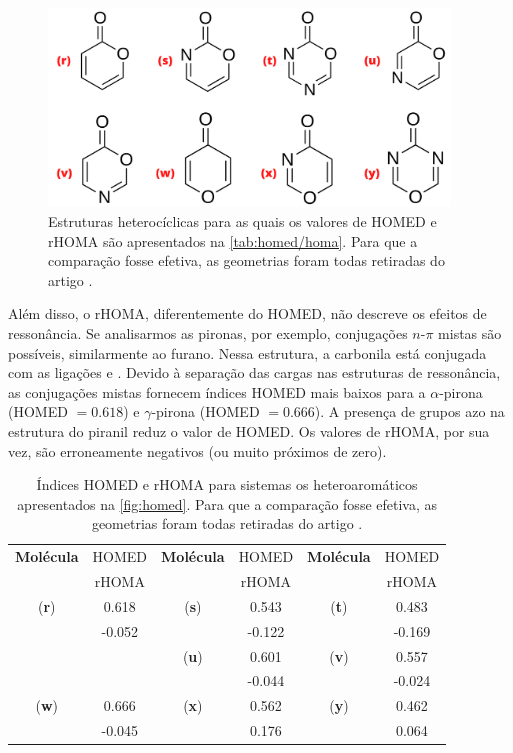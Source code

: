 \begin{figure}[htb]
\caption{\label{fig:homed/2} Estruturas heterocíclicas para as quais os valores de \gls{HOMED} e \gls{rHOMA} são apresentados na \autoref{tab:homed/homa}. Para que a comparação fosse efetiva, as geometrias foram todas retiradas do artigo \cite{giov2020}.}
	\begin{center}
		\includegraphics[width=0.95\textwidth]{images/fig2(8).png}
	\end{center}
\end{figure}

Além disso, o \gls{rHOMA}, diferentemente do \gls{HOMED}, não descreve os efeitos de ressonância. Se analisarmos as pironas, por exemplo, conjugações $n$-$\pi$ mistas são possíveis, similarmente ao furano. Nessa estrutura, a carbonila está conjugada com as ligações  e . Devido à separação das cargas nas estruturas de ressonância, as conjugações mistas fornecem índices \gls{HOMED} mais baixos para a $\alpha$-pirona (\gls{HOMED} $=0.618$) e $\gamma$-pirona (\gls{HOMED} $=0.666$). A presença de grupos azo na estrutura do piranil reduz o valor de \gls{HOMED}. Os valores de \gls{rHOMA}, por sua vez, são erroneamente negativos (ou muito próximos de zero).

\begin{table}[htb]
	\centering
	\caption{\label{tab:homed/homa} Índices \gls{HOMED} e \gls{rHOMA} para sistemas os heteroaromáticos apresentados na \autoref{fig:homed}. Para que a comparação fosse efetiva, as geometrias foram todas retiradas do artigo \cite{giov2020}.}
	\begin{tabular}{cccccc}
		\toprule
	\textbf{Molécula} & \gls{HOMED} & \textbf{Molécula} & \gls{HOMED} & \textbf{Molécula} & \gls{HOMED}
 \\
  & \gls{rHOMA} & & \gls{rHOMA} & & \gls{rHOMA}
 \\
		\midrule
    (\textbf{r}) & 0.618 & (\textbf{s}) & 0.543 & (\textbf{t}) & 0.483 \\
     & -0.052 &  & -0.122 &  & -0.169 \\
    & & (\textbf{u}) & 0.601 & (\textbf{v}) & 0.557 \\
    & &  & -0.044 & & -0.024 \\
    (\textbf{w}) & 0.666 & (\textbf{x}) & 0.562 & (\textbf{y}) & 0.462 \\
    & -0.045 & & 0.176 & & 0.064 \\
    \bottomrule
	\end{tabular}
\end{table}

